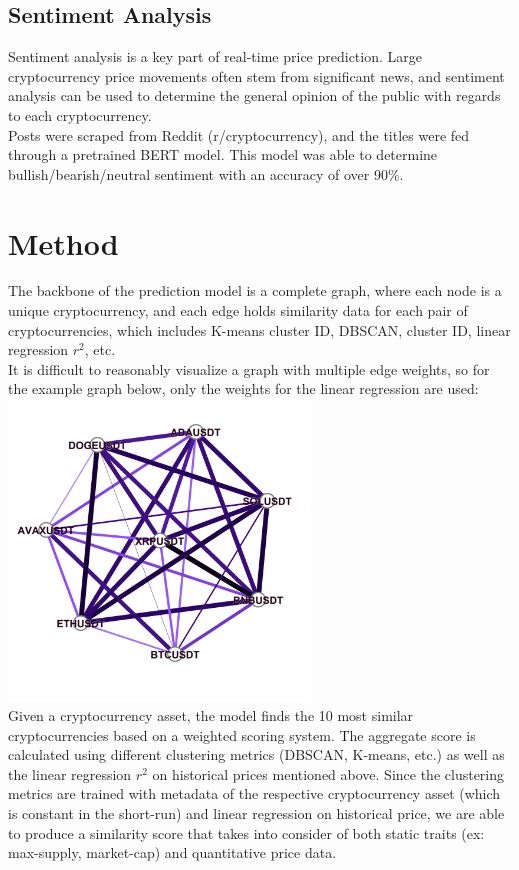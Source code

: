 \documentclass[11pt]{article}
\newcommand{\np}{\newpage}
\begin{document}
\subsection{Sentiment Analysis}
Sentiment analysis is a key part of real-time price prediction.  Large cryptocurrency price movements often stem from significant news, and sentiment analysis can be used to determine the general opinion of the public with regards to each cryptocurrency.\\[2mm]
Posts were scraped from Reddit (r/cryptocurrency), and the titles were fed through a pretrained BERT model.  This model was able to determine bullish/bearish/neutral sentiment with an accuracy of over 90\%.\\[2mm]
\np

\section{Method}
The backbone of the prediction model is a complete graph, where each node is a unique cryptocurrency, and each edge holds similarity data for each pair of cryptocurrencies, which includes K-means cluster ID, DBSCAN, cluster ID, linear regression $r^{2}$, etc.\\[2mm]
It is difficult to reasonably visualize a graph with multiple edge weights, so for the example graph below, only the weights for the linear regression are used:\\[2mm]
\includegraphics[width=8cm]{correlation_graph_small2.png}\\[2mm]
Given a cryptocurrency asset, the model finds the 10 most similar cryptocurrencies based on a weighted scoring system. The aggregate score is calculated using different clustering metrics (DBSCAN, K-means, etc.) as well as the linear regression $r^{2}$ on historical prices mentioned above. Since the clustering metrics are trained with metadata of the respective cryptocurrency asset (which is constant in the short-run) and linear regression on historical price, we are able to produce a similarity score that takes into consider of both static traits (ex: max-supply, market-cap) and quantitative price data.\\[2mm]
\end{document}
